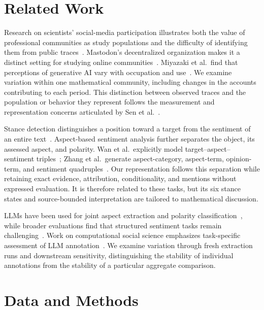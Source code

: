 \documentclass[sigconf,balance=false]{acmart}
\begin{document}
\section{Related Work}
Research on scientists' social-media participation illustrates both the value of professional communities as study populations and the difficulty of identifying them from public traces~\cite{ke2017scientists}. Mastodon's decentralized organization makes it a distinct setting for studying online communities~\cite{zignani2018mastodon}. Miyazaki et al.\ find that perceptions of generative AI vary with occupation and use~\cite{miyazaki2024}. We examine variation within one mathematical community, including changes in the accounts contributing to each period. This distinction between observed traces and the population or behavior they represent follows the measurement and representation concerns articulated by Sen et al.~\cite{sen2021tedon}.

Stance detection distinguishes a position toward a target from the sentiment of an entire text~\cite{sobhani2016stance}. Aspect-based sentiment analysis further separates the object, its assessed aspect, and polarity. Wan et al.\ explicitly model target--aspect--sentiment triples~\cite{wan2020target}; Zhang et al.\ generate aspect-category, aspect-term, opinion-term, and sentiment quadruples~\cite{zhang2021quad}. Our representation follows this separation while retaining exact evidence, attribution, conditionality, and mentions without expressed evaluation. It is therefore related to these tasks, but its six stance states and source-bounded interpretation are tailored to mathematical discussion.

LLMs have been used for joint aspect extraction and polarity classification~\cite{simmering2023absa}, while broader evaluations find that structured sentiment tasks remain challenging~\cite{zhang2024reality}. Work on computational social science emphasizes task-specific assessment of LLM annotation~\cite{ziems2024css,pangakis2023validation}. We examine variation through fresh extraction runs and downstream sensitivity, distinguishing the stability of individual annotations from the stability of a particular aggregate comparison.

\section{Data and Methods}
\end{document}
